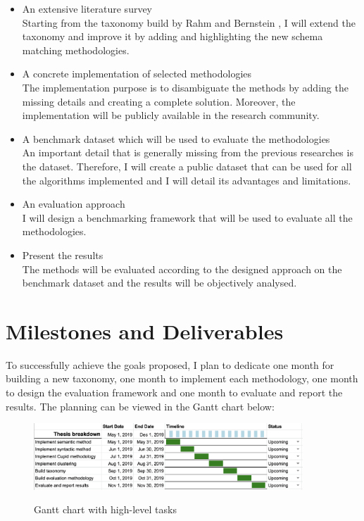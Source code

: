 \documentclass[a4paper]{article}
\begin{document}
\begin{itemize}
	\item An extensive literature survey \\
	Starting from the taxonomy build by Rahm and Bernstein \cite{rahm2001survey}, I will extend the taxonomy and improve it by adding and highlighting the new schema matching methodologies.
	\item A concrete implementation of selected methodologies \\
	The implementation purpose is to disambiguate the methods by adding the missing details and creating a complete solution. Moreover, the implementation will be publicly available in the research community. 
	\item A benchmark dataset which will be used to evaluate the methodologies \\
	An important detail that is generally missing from the previous researches is the dataset. Therefore, I will create a public dataset that can be used for all the algorithms implemented and I will detail its advantages and limitations.
	\item An evaluation approach \\
	I will design a benchmarking framework that will be used to evaluate all the methodologies. 
	\item Present the results \\
	The methods will be evaluated according to the designed approach on the benchmark dataset and the results will be objectively analysed. 
\end{itemize}

\section{Milestones and Deliverables}
To successfully achieve the goals proposed, I plan to dedicate one month for building a new taxonomy, one month to implement each methodology, one month to design the evaluation framework and one month to evaluate and report the results. The planning can be viewed in the Gantt chart below: 

\begin{figure}[H]
	\centering
    {{\includegraphics[width=0.9\textwidth] {figures/gantt.png}}}%
    \caption{Gantt chart with high-level tasks}
    \label{Figure:gantt}
\end{figure}


\printbibliography

\end{document}
